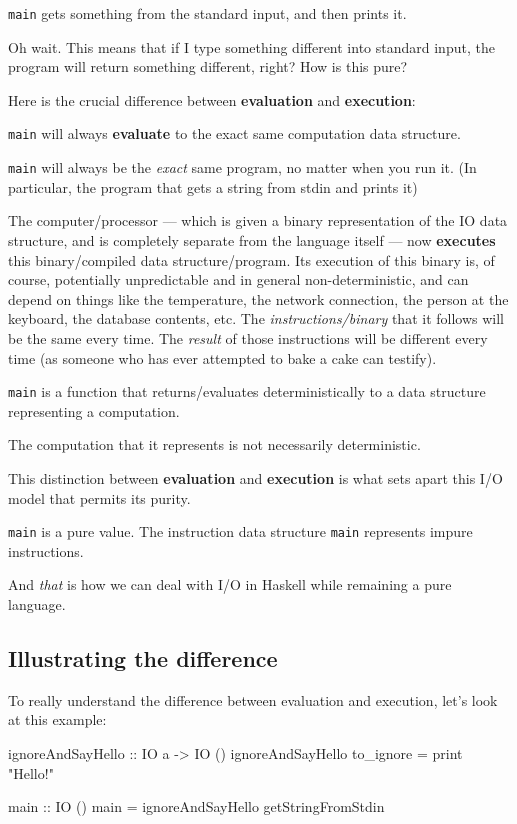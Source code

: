 \documentclass[]{article}
\newenvironment{Shaded}{}{}
\newcommand{\DataTypeTok}[1]{\textcolor[rgb]{0.56,0.13,0.00}{#1}}
\newcommand{\FunctionTok}[1]{\textcolor[rgb]{0.02,0.16,0.49}{#1}}
\newcommand{\NormalTok}[1]{#1}
\newcommand{\OtherTok}[1]{\textcolor[rgb]{0.00,0.44,0.13}{#1}}
\newcommand{\StringTok}[1]{\textcolor[rgb]{0.25,0.44,0.63}{#1}}
\begin{document}
\texttt{main} gets something from the standard input, and then prints it.

Oh wait. This means that if I type something different into standard input, the
program will return something different, right? How is this pure?

Here is the crucial difference between \textbf{evaluation} and
\textbf{execution}:

\texttt{main} will always \textbf{evaluate} to the exact same computation data
structure.

\texttt{main} will always be the \emph{exact} same program, no matter when you
run it. (In particular, the program that gets a string from stdin and prints it)

The computer/processor --- which is given a binary representation of the IO data
structure, and is completely separate from the language itself --- now
\textbf{executes} this binary/compiled data structure/program. Its execution of
this binary is, of course, potentially unpredictable and in general
non-deterministic, and can depend on things like the temperature, the network
connection, the person at the keyboard, the database contents, etc. The
\emph{instructions/binary} that it follows will be the same every time. The
\emph{result} of those instructions will be different every time (as someone who
has ever attempted to bake a cake can testify).

\texttt{main} is a function that returns/evaluates deterministically to a data
structure representing a computation.

The computation that it represents is not necessarily deterministic.

This distinction between \textbf{evaluation} and \textbf{execution} is what sets
apart this I/O model that permits its purity.

\texttt{main} is a pure value. The instruction data structure \texttt{main}
represents impure instructions.

And \emph{that} is how we can deal with I/O in Haskell while remaining a pure
language.

\subsection{Illustrating the difference}\label{illustrating-the-difference}

To really understand the difference between evaluation and execution, let's look
at this example:

\begin{Shaded}
\begin{Highlighting}[]
\OtherTok{ignoreAndSayHello ::} \DataTypeTok{IO}\NormalTok{ a }\OtherTok{{-}\textgreater{}} \DataTypeTok{IO}\NormalTok{ ()}
\NormalTok{ignoreAndSayHello to\_ignore }\OtherTok{=} \FunctionTok{print} \StringTok{"Hello!"}

\OtherTok{main ::} \DataTypeTok{IO}\NormalTok{ ()}
\NormalTok{main }\OtherTok{=}\NormalTok{ ignoreAndSayHello getStringFromStdin}
\end{Highlighting}
\end{Shaded}
\end{document}
